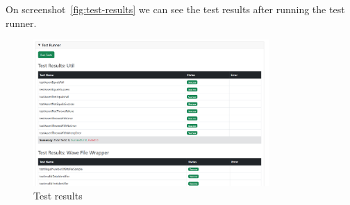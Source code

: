 On screenshot~\autoref{fig:test-results} we can see the test results after running the test runner.
\begin{figure}[H]
    \centering
    \includegraphics[width=0.8\textwidth]{../assets/test_results.png}
    \caption{Test results}\label{fig:test-results}
\end{figure}

